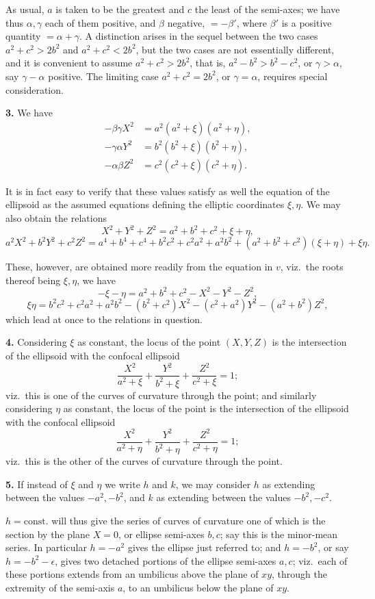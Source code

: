 \documentclass[11pt,a4paper]{article}
\begin{document}
As usual, $a$ is taken to be the greatest and $c$ the least of the semi-axes; we have thus $\alpha,\gamma$ each of them positive, and $\beta$ negative, $=-\beta'$, where $\beta'$ is a positive quantity $=\alpha+\gamma$. A distinction arises in the sequel between the two cases $a^2+c^2>2b^2$ and $a^2+c^2<2b^2$, but the two cases are not essentially different, and it is convenient to assume $a^2+c^2>2b^2$, that is, $a^2-b^2>b^2-c^2$, or $\gamma>\alpha$, say $\gamma-\alpha$ positive. The limiting case $a^2+c^2=2b^2$, or $\gamma=\alpha$, requires special consideration.

\textbf{3.} We have
\begin{align*}
-\beta\gamma X^2&=a^2(a^2+\xi)(a^2+\eta),\\
-\gamma\alpha Y^2&=b^2(b^2+\xi)(b^2+\eta),\\
-\alpha\beta Z^2&=c^2(c^2+\xi)(c^2+\eta).
\end{align*}

It is in fact easy to verify that these values satisfy as well the equation of the ellipsoid as the assumed equations defining the elliptic coordinates $\xi, \eta$. We may also obtain the relations
\[
X^2+Y^2+Z^2=a^2+b^2+c^2+\xi+\eta,
\]
\[
a^2X^2+b^2Y^2+c^2Z^2
=a^4+b^4+c^4+b^2c^2+c^2a^2+a^2b^2+(a^2+b^2+c^2)(\xi+\eta)+\xi\eta.
\]

These, however, are obtained more readily from the equation in $v$, viz.\ the roots thereof being $\xi,\eta$, we have
\[
-\xi-\eta=a^2+b^2+c^2-X^2-Y^2-Z^2,
\]
\[
\xi\eta=b^2c^2+c^2a^2+a^2b^2-(b^2+c^2)X^2-(c^2+a^2)Y^2-(a^2+b^2)Z^2,
\]
which lead at once to the relations in question.

\textbf{4.} Considering $\xi$ as constant, the locus of the point $(X, Y, Z)$ is the intersection of the ellipsoid with the confocal ellipsoid
\[
\frac{X^2}{a^2+\xi}+\frac{Y^2}{b^2+\xi}+\frac{Z^2}{c^2+\xi}=1;
\]
viz.\ this is one of the curves of curvature through the point; and similarly considering $\eta$ as constant, the locus of the point is the intersection of the ellipsoid with the confocal ellipsoid
\[
\frac{X^2}{a^2+\eta}+\frac{Y^2}{b^2+\eta}+\frac{Z^2}{c^2+\eta}=1;
\]
viz.\ this is the other of the curves of curvature through the point.

\textbf{5.} If instead of $\xi$ and $\eta$ we write $h$ and $k$, we may consider $h$ as extending between the values $-a^2,-b^2$, and $k$ as extending between the values $-b^2,-c^2$.

$h=\mathrm{const.}$ will thus give the series of curves of curvature one of which is the section by the plane $X=0$, or ellipse semi-axes $b,c$; say this is the minor-mean series. In particular $h=-a^2$ gives the ellipse just referred to; and $h=-b^2$, or say $h=-b^2-\epsilon$, gives two detached portions of the ellipse semi-axes $a,c$; viz.\ each of these portions extends from an umbilicus above the plane of $xy$, through the extremity of the semi-axis $a$, to an umbilicus below the plane of $xy$.
\end{document}
